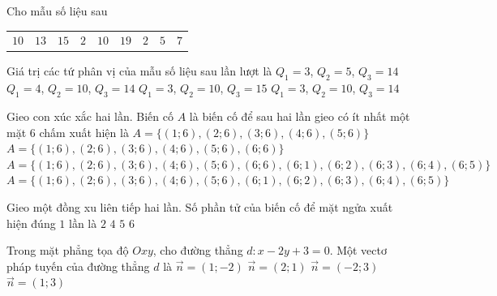 \begin{ex}%
	Cho mẫu số liệu sau
	\begin{center}
		\begin{tabular}{ccccccccc}
			$10$ & $13$ & $15$ & $2$ & $10$ & $19$ & $2$ & $5$ & $7$
		\end{tabular}
	\end{center}
	Giá trị các tứ phân vị của mẫu số liệu sau lần lượt là
	\choice
	{$Q_1=3$, $Q_2=5$, $Q_3=14$}
	{$Q_1=4$, $Q_2=10$, $Q_3=14$}
	{$Q_1=3$, $Q_2=10$, $Q_3=15$}
	{\True $Q_1=3$, $Q_2=10$, $Q_3=14$}
\end{ex}

\begin{ex}%
	Gieo con xúc xắc hai lần. Biến cố $A$ là biến cố để sau hai lần gieo có ít nhất một mặt $6$ chấm xuất hiện là
	\choice
	{$A=\{(1;6),(2;6),(3;6),(4;6),(5;6)\}$}
	{$A=\{(1;6),(2;6),(3;6),(4;6),(5;6),(6;6)\}$}
	{\True $A=\{(1;6),(2;6),(3;6),(4;6),(5;6),(6;6),(6;1),(6;2),(6;3),(6;4),(6;5)\}$}
	{$A=\{(1;6),(2;6),(3;6),(4;6),(5;6),(6;1),(6;2),(6;3),(6;4),(6;5)\}$}
\end{ex}

\begin{ex}%
	Gieo một đồng xu liên tiếp hai lần. Số phần tử của biến cố để mặt ngửa xuất hiện đúng $1$ lần là
	\choice
	{\True $2$}
	{$4$}
	{$5$}
	{$6$}
\end{ex}

\begin{ex}%
	Trong mặt phẳng tọa độ $Oxy$, cho đường thẳng $d\colon x-2y+3=0$. Một vectơ pháp tuyến của đường thẳng $d$ là
	\choice
	{\True $\overrightarrow{n}=(1;-2)$}
	{$\overrightarrow{n}=(2;1)$}
	{$\overrightarrow{n}=(-2;3)$}
	{$\overrightarrow{n}=(1;3)$}
\end{ex}


